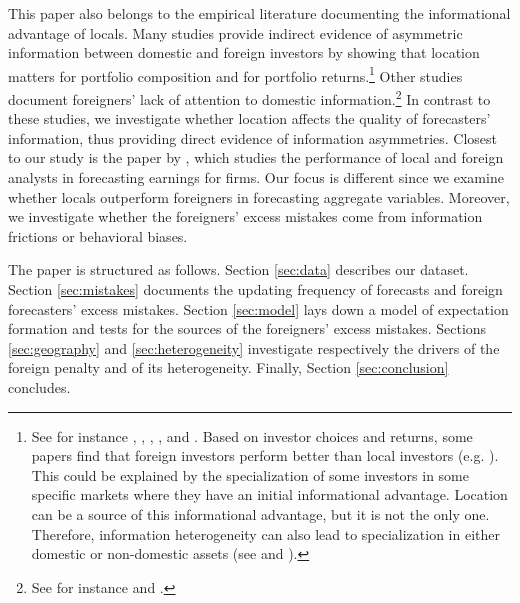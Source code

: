 This paper also belongs to the empirical literature documenting the informational advantage of locals. Many studies provide indirect evidence of asymmetric information between domestic and foreign investors by showing that location matters for portfolio composition and for portfolio returns.\footnote{See for instance \citet{KangStulz1997}, \citet{GrinblattKeloharju2001}, \citet{PortesRey2005}, \citet{Hau2001}, and \citet{Clemensetal2020}. Based on investor choices and returns, some papers find that foreign investors perform better than local investors (e.g. \citet{GrinblattKeloharju2000}). This could be explained by the specialization of some investors in some specific markets where they have an initial informational advantage. Location can be a source of this informational advantage, but it is not the only one. Therefore, information heterogeneity can also lead to specialization in either domestic or non-domestic assets (see \citet{VanNieuwerburghVeldkamp2010} and \citet{DeMarcoetal2021}).} Other studies document foreigners' lack of attention to domestic information.\footnote{See for instance \citet{Mondriaetal2010} and \citet{Czirakietal2021}.} In contrast to these studies, we investigate whether location affects the quality of forecasters' information, thus providing direct evidence of information asymmetries. Closest to our study is the paper by \citet{Baeetal2008}, which studies the performance of local and foreign analysts in forecasting earnings for firms. Our focus is different since we examine whether locals outperform foreigners in forecasting aggregate variables. Moreover, we investigate whether the foreigners' excess mistakes come from information frictions or behavioral biases.

The paper is structured as follows. Section \ref{sec:data} describes our dataset. Section \ref{sec:mistakes} documents the updating frequency of forecasts and foreign forecasters' excess mistakes. Section \ref{sec:model} lays down a model of expectation formation and tests for the sources of the foreigners' excess mistakes. Sections \ref{sec:geography} and \ref{sec:heterogeneity} investigate respectively the drivers of the foreign penalty and of its heterogeneity. Finally, Section  \ref{sec:conclusion} concludes.

